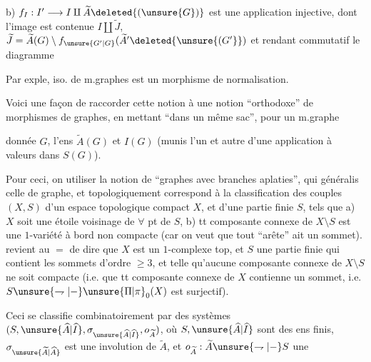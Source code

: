 
b) $f_I:I'\longrightarrow I\amalg\widetilde A\deleted{(\unsure{G})}$ est une application injective, dont l'image est contenue $I\amalg\widetilde J$,  $\widetilde J=\widetilde A(G)\setminus f_{\unsure{G'|G}}(\widetilde A'\deleted{\unsure{(G'}})$ et rendant commutatif le diagramme

Par exple, iso. de m.graphes est un morphisme de normalisation. 

Voici une façon de raccorder cette notion à une notion ``orthodoxe'' de morphismes de graphes, en mettant ``dans un même sac'', pour un m.graphe

donnée $G$, l'ens $\widetilde A(G)$ et $I(G)$ (munis l'un et autre d'une application  à valeurs dans $S(G)$).

Pour ceci, on  utiliser la notion de ``graphes avec branches aplaties'', qui généralis celle de graphe, et topologiquement correspond à la classification des  couples $(X,S)$ d'un espace topologique compact $X$, et d'une partie finie $S$, tels que a) $X$ soit une étoile  voisinage de $\forall$ pt de $S$,  b)  tt composante connexe de $X\setminus S$ est une $1$-variété à bord non compacte (car on veut que tout  ``arête'' ait un sommet).  revient au $=$ de dire que $X$ est un $1$-complexe top, et $S$ une partie finie qui contient les sommets d'ordre $\geq3$, et telle qu'aucune composante connexe de $X\setminus S$ ne soit compacte (i.e. que tt composante connexe de $X$ contienne un sommet, i.e. $S\unsure{\rightharpoondown|{-}}\unsure{\Pi|\pi}_0(X)$ est surjectif).

Ceci se classifie combinatoirement par des systèmes $(S,\unsure{\widehat A|\widehat I},\sigma_{\unsure{\widehat A|\widehat I}},o_{\widetilde A})$, où  $S,\unsure{\widehat A|\widehat I}$ sont des ens finis, $\sigma_{\unsure{\widetilde A|\widehat A}}$ est une involution de $\widetilde A$, et $o_{\widetilde A}:\widetilde A\unsure{\rightharpoondown|{-}}S$ une

